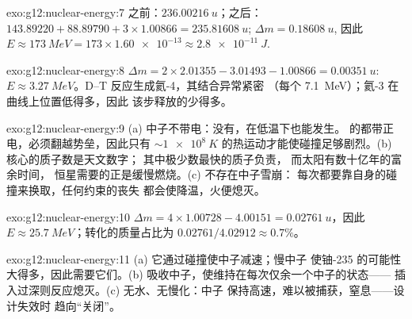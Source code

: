 \begin{solution}{exo:g12:nuclear-energy:7}
之前：$\qty{236.00216}{u}$；之后：$143.89220 + 88.89790 +
3 \times 1.00866 = \qty{235.81608}{u}$; $\Delta m = \qty{0.18608}{u}$,
因此 $E \approx \qty{173}{MeV} = 173 \times \num{1.60e-13} \approx
\qty{2.8e-11}{J}$.
\end{solution}

\begin{solution}{exo:g12:nuclear-energy:8}
$\Delta m = 2 \times 2.01355 - 3.01493 - 1.00866 = \qty{0.00351}{u}$:
$E \approx \qty{3.27}{MeV}$。D--T 反应生成氦-4，其结合异常紧密
（每个 \qty{7.1}{MeV}）；氦-3 在曲线上位置低得多，因此
该步释放的少得多。
\end{solution}

\begin{solution}{exo:g12:nuclear-energy:9}
(a) 中子不带电：没有，在低温下也能发生。
的都带正电，必须翻越势垒，因此只有
$\sim \qty{1e8}{K}$ 的热运动才能使碰撞足够剧烈。(b) 核心的质子数是天文数字；
其中极少数最快的质子负责，
而太阳有数十亿年的富余时间，
恒星需要的正是缓慢燃烧。(c) 不存在中子雪崩：
每次都要靠自身的碰撞来换取，任何约束的丧失
都会使降温，火便熄灭。
\end{solution}

\begin{solution}{exo:g12:nuclear-energy:10}
$\Delta m = 4 \times 1.00728 - 4.00151 = \qty{0.02761}{u}$，因此
$E \approx \qty{25.7}{MeV}$；转化的质量占比为
$0.02761/4.02912 \approx 0.7\%$。
\end{solution}

\begin{solution}{exo:g12:nuclear-energy:11}
(a) 它通过碰撞使中子减速；慢中子
使铀-235 的可能性大得多，因此需要它们。(b) 
吸收中子，使维持在每次仅余一个中子的状态——
插入过深则反应熄灭。(c) 无水、无慢化：中子
保持高速，难以被捕获，窒息——设计失效时
趋向“关闭”。
\end{solution}

